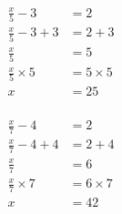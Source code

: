 \documentclass[12pt]{article}
\newcounter{minipagecount}
\begin{document}
\begin{multicols}{2}
\begin{minipage}[t]{0.45\textwidth}
    \begin{align*} %
        \frac{x}{5} - 3 &= 2\\
        \frac{x}{5} - 3 + 3 &= 2 + 3\\
        \frac{x}{5} &= 5\\
        \frac{x}{5} \times5 &= 5 \times5\\
        x &= 25\\
    \end{align*}
\end{minipage} %
\noindent{(\theminipagecount)}\hspace{0.1mm} %
\begin{minipage}[t]{0.45\textwidth} %
    \vspace{-26pt}  %
    \raggedright %
    \begin{align*} %
        \frac{x}{7} - 4 &= 2\\
        \frac{x}{7} - 4 + 4 &= 2 + 4\\
        \frac{x}{7} &= 6\\
        \frac{x}{7} \times7 &= 6 \times7\\
        x &= 42\\
    \end{align*}
\end{minipage} %
\noindent{(\theminipagecount)}\hspace{0.1mm} %
\begin{minipage}[t]{0.45\textwidth} %
    \vspace{-26pt}  %

\end{minipage}
\end{multicols}
\end{document}
